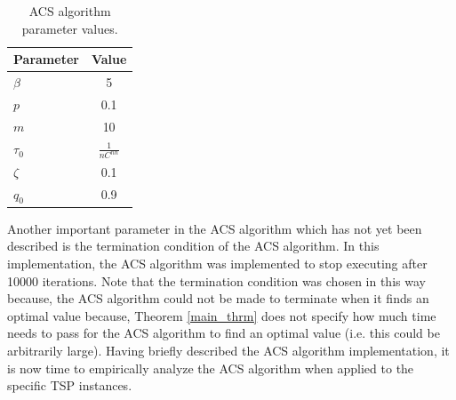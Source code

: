 \documentclass[12pt]{article}
\numberwithin{equation}{subsection}
\numberwithin{table}{subsection}
\numberwithin{algorithm}{subsection}
\numberwithin{figure}{subsection}
\begin{document}
\begin{table}[H]
    \caption{ACS algorithm parameter values.}
    \centering
    \label{tab:param}
    \begin{tabular}{l|c|} %
      \textbf{Parameter} & \textbf{Value}\\
      \hline
    $\beta$ & 5\\
    $p$ & 0.1\\
    $m$ & 10\\
    $\tau_0$ & $\frac{1}{nC^{nn}}$\\
    $\zeta$ & 0.1\\
    $q_0$  & 0.9
    \end{tabular}
\end{table}
Another important parameter in the ACS algorithm which has not yet been described is the termination condition of the ACS algorithm. In this implementation, the ACS algorithm was implemented to stop executing after 10000 iterations. Note that the termination condition was chosen in this way because, the ACS algorithm could not be made to terminate when it finds an optimal value because, Theorem \ref{main_thrm} does not specify how much time needs to pass for the ACS algorithm to find an optimal value (i.e. this could be arbitrarily large). Having briefly described the ACS algorithm implementation, it is now time to empirically analyze the ACS algorithm when applied to the specific TSP instances.
\end{document}
